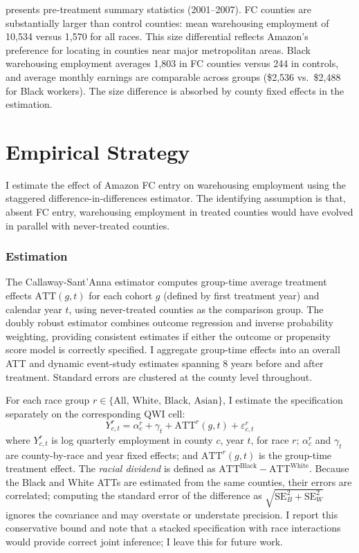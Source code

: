 \documentclass[12pt]{article}
\begin{document}


 presents pre-treatment summary statistics (2001--2007). FC counties are substantially larger than control counties: mean warehousing employment of 10,534 versus 1,570 for all races. This size differential reflects Amazon's preference for locating in counties near major metropolitan areas. Black warehousing employment averages 1,803 in FC counties versus 244 in controls, and average monthly earnings are comparable across groups (\$2,536 vs.\ \$2,488 for Black workers). The size difference is absorbed by county fixed effects in the estimation.


\section{Empirical Strategy}

I estimate the effect of Amazon FC entry on warehousing employment using the \citet{CallawayandSantAnna2021} staggered difference-in-differences estimator. The identifying assumption is that, absent FC entry, warehousing employment in treated counties would have evolved in parallel with never-treated counties.

\subsubsection*{Estimation} The Callaway-Sant'Anna estimator computes group-time average treatment effects $\text{ATT}(g,t)$ for each cohort $g$ (defined by first treatment year) and calendar year $t$, using never-treated counties as the comparison group. The doubly robust estimator combines outcome regression and inverse probability weighting, providing consistent estimates if either the outcome or propensity score model is correctly specified. I aggregate group-time effects into an overall ATT and dynamic event-study estimates spanning 8 years before and after treatment. Standard errors are clustered at the county level throughout.

For each race group $r \in \{\text{All, White, Black, Asian}\}$, I estimate the specification separately on the corresponding QWI cell:
\begin{equation}
Y_{c,t}^r = \alpha_c^r + \gamma_t + \text{ATT}^r(g,t) + \varepsilon_{c,t}^r
\end{equation}
where $Y_{c,t}^r$ is log quarterly employment in county $c$, year $t$, for race $r$; $\alpha_c^r$ and $\gamma_t$ are county-by-race and year fixed effects; and $\text{ATT}^r(g,t)$ is the group-time treatment effect. The \textit{racial dividend} is defined as $\text{ATT}^{\text{Black}} - \text{ATT}^{\text{White}}$. Because the Black and White ATTs are estimated from the same counties, their errors are correlated; computing the standard error of the difference as $\sqrt{\text{SE}_B^2 + \text{SE}_W^2}$ ignores the covariance and may overstate or understate precision. I report this conservative bound and note that a stacked specification with race interactions would provide correct joint inference; I leave this for future work.
\end{document}
